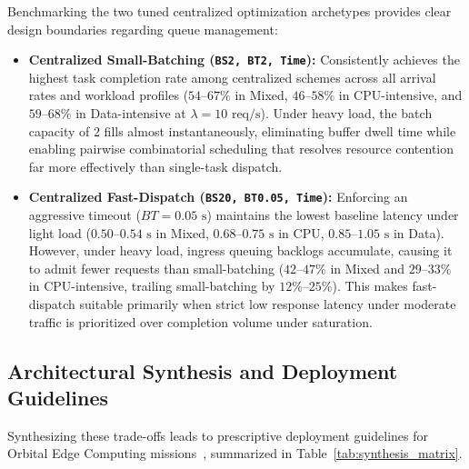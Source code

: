 Benchmarking the two tuned centralized optimization archetypes provides clear design boundaries regarding queue management:
\begin{itemize}
    \item \textbf{Centralized Small-Batching (\texttt{BS2, BT2, Time}):} 
    Consistently achieves the highest task completion rate among centralized schemes across all arrival rates and workload profiles ($54\text{--}67\%$ in Mixed, $46\text{--}58\%$ in CPU-intensive, and $59\text{--}68\%$ in Data-intensive at $\lambda = 10\text{ req/s}$). Under heavy load, the batch capacity of 2 fills almost instantaneously, eliminating buffer dwell time while enabling pairwise combinatorial scheduling that resolves resource contention far more effectively than single-task dispatch.
    \item \textbf{Centralized Fast-Dispatch (\texttt{BS20, BT0.05, Time}):} 
    Enforcing an aggressive timeout ($BT = 0.05\text{ s}$) maintains the lowest baseline latency under light load ($0.50\text{--}0.54\text{ s}$ in Mixed, $0.68\text{--}0.75\text{ s}$ in CPU, $0.85\text{--}1.05\text{ s}$ in Data). However, under heavy load, ingress queuing backlogs accumulate, causing it to admit fewer requests than small-batching ($42\text{--}47\%$ in Mixed and $29\text{--}33\%$ in CPU-intensive, trailing small-batching by $12\%\text{--}25\%$). This makes fast-dispatch suitable primarily when strict low response latency under moderate traffic is prioritized over completion volume under saturation.
\end{itemize}

\subsection{Architectural Synthesis and Deployment Guidelines}
\label{subsec:deployment_guidelines}

Synthesizing these trade-offs leads to prescriptive deployment guidelines for Orbital Edge Computing missions~\cite{denby2020asplos, survey_orbital_edge_2023, leyva2023satellite}, summarized in Table~\ref{tab:synthesis_matrix}.

